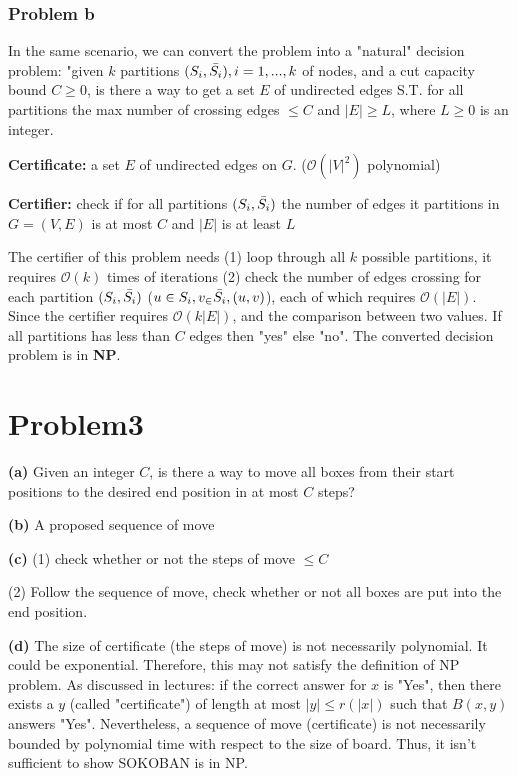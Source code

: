 \documentclass[openany]{article}
\begin{document}
\subsubsection*{Problem b}
In the same scenario, we can convert the problem into a "natural" decision problem: "given $k$ partitions $(S_i, \Bar{S_i}), i = 1, . . . , k$ of nodes, and a cut capacity bound $C \geqslant 0$, is there a way to get a set $E$ of undirected edges S.T. for all partitions the max number of crossing edges $\leqslant C$ and $|E| \geqslant L$, where $L\geqslant 0$ is an integer.

\textbf{Certificate:} a set $E$ of undirected edges on $G$. ($\mathcal{O}(|V|^2)$ polynomial)

\textbf{Certifier:} check if for all partitions $(S_i,\Bar{S_i})$ the number of edges it partitions in $G=(V,E)$ is at most $C$ and $|E|$ is at least $L$

The certifier of this problem needs (1) loop through all $k$ possible partitions, it requires $\mathcal{O}(k)$ times of iterations (2) check the number of edges crossing for each partition $(S_i, \Bar{S_i})$ ($u \in S_i, v_\in \Bar{S_i}, (u,v)$), each of which requires $\mathcal{O}(|E|)$. Since the certifier requires $\mathcal{O}(k|E|)$, and the comparison between two values. If all partitions has less than $C$ edges then "yes" else "no". The converted decision problem is in \textbf{NP}.

\section*{Problem3}

\textbf{(a)}
Given an integer $C$, is there a way to move all boxes from their start positions to the desired end position in at most $C$ steps?

\textbf{(b)}
A proposed sequence of move

\textbf{(c)}
(1) check whether or not the steps of move $\leqslant C$

(2)  Follow the sequence of move, check whether or not all boxes are put into the end position.

\textbf{(d)}
The size of certificate (the steps of move) is not necessarily polynomial. It could be exponential. Therefore, this may not satisfy the definition of NP problem. As discussed in lectures: if the correct answer for $x$ is "Yes", then there exists a $y$ (called "certificate") of length at most $|y| \leqslant r(|x|)$ such that $B(x,y)$ answers "Yes". Nevertheless, a sequence of move (certificate) is not necessarily bounded by polynomial time with respect to the size of board. Thus, it isn't sufficient to show SOKOBAN is in NP.
\end{document}

